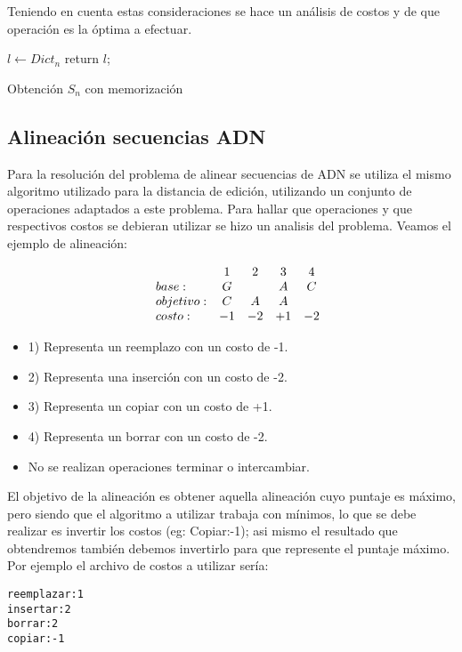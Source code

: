 \documentclass[12pt]{article}
\begin{document}
Teniendo en cuenta estas consideraciones se hace un análisis de costos y 
de que operación es la óptima a efectuar.
\\

\begin{algorithm}[H]
	\SetAlgoLined
	
	
	$l\leftarrow Dict_{n}$\;
	return $l$;

\caption{Obtención $S_{n}$ con memorización}
\end{algorithm}

\subsection{Alineación secuencias ADN}
Para la resolución del problema de alinear secuencias de ADN se utiliza 
el mismo algoritmo utilizado para la distancia de edición, utilizando un
conjunto de operaciones adaptados a este problema. Para hallar que operaciones
y que respectivos costos se debieran utilizar se hizo un analisis del problema.
Veamos el ejemplo de alineación:

\[
\begin{array}{clcccc}
 & &1 &2 &3 &4 \\
  &base: &G &\space &A &C \\
  &objetivo: &C &A &A&\space \\
  &costo: &-1 &-2 &+1 &-2 
\end{array}
\]

\begin{itemize}
	\item 1) Representa un reemplazo con un costo de -1.
	\item 2) Representa una inserción con un costo de -2.
	\item 3) Representa un copiar con un costo de +1.
	\item 4) Representa un borrar con un costo de -2.
	\item No se realizan operaciones terminar o intercambiar.
\end{itemize}

El objetivo de la alineación es obtener aquella alineación cuyo puntaje
es máximo, pero siendo que el algoritmo a utilizar trabaja con mínimos,
lo que se debe realizar es invertir los costos (eg: Copiar:-1); asi mismo
el resultado que obtendremos también debemos invertirlo para que represente
el puntaje máximo.
Por ejemplo el archivo de costos a utilizar sería:
\begin{lstlisting}
reemplazar:1
insertar:2
borrar:2
copiar:-1
\end{lstlisting}
\end{document}
